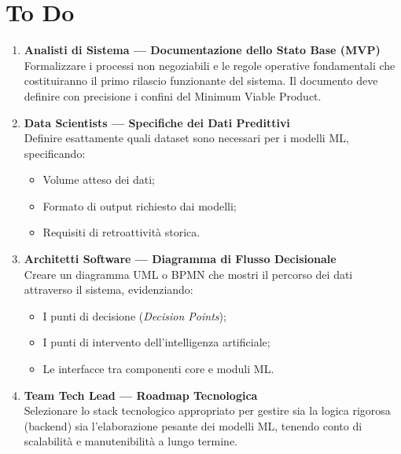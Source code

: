 \documentclass[12pt, a4paper]{article}
\begin{document}
\section{To Do}

\begin{enumerate}[leftmargin=1.5cm, label=\textbf{\arabic*.}]

  \item \textbf{Analisti di Sistema — Documentazione dello Stato Base (MVP)}\\
  Formalizzare i processi non negoziabili e le regole operative fondamentali che costituiranno il primo rilascio funzionante del sistema. Il documento deve definire con precisione i confini del Minimum Viable Product.

  \item \textbf{Data Scientists — Specifiche dei Dati Predittivi}\\
  Definire esattamente quali dataset sono necessari per i modelli ML, specificando:
  \begin{itemize}
    \item Volume atteso dei dati;
    \item Formato di output richiesto dai modelli;
    \item Requisiti di retroattività storica.
  \end{itemize}

  \item \textbf{Architetti Software — Diagramma di Flusso Decisionale}\\
  Creare un diagramma UML o BPMN che mostri il percorso dei dati attraverso il sistema, evidenziando:
  \begin{itemize}
    \item I punti di decisione (\textit{Decision Points});
    \item I punti di intervento dell'intelligenza artificiale;
    \item Le interfacce tra componenti core e moduli ML.
  \end{itemize}

  \item \textbf{Team Tech Lead — Roadmap Tecnologica}\\
  Selezionare lo stack tecnologico appropriato per gestire sia la logica rigorosa (backend) sia l'elaborazione pesante dei modelli ML, tenendo conto di scalabilità e manutenibilità a lungo termine.

\end{enumerate}
\end{document}
